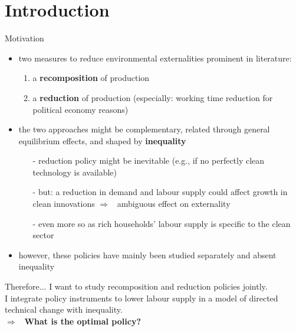 \documentclass[11pt,aspectratio=169]{beamer}
\newcommand{\ar}{$\Rightarrow$ \ }
\begin{document}
\section{Introduction}
\begin{frame}{Motivation}

\begin{itemize}
\item two measures to reduce environmental externalities prominent in literature: 
\begin{enumerate}
\item a \alert{\textbf{recomposition}} of production
\item a \textbf{\alert{reduction}} of production (especially: working time reduction for political economy reasons)
\end{enumerate}
\vspace{3mm} 
\item the two approaches might be complementary, related through general equilibrium effects, and shaped by \textbf{\alert{inequality}}
\vspace{3mm}
\begin{itemize}
\item[-] reduction policy might be inevitable (e.g., if no perfectly clean technology is available)
\item[-] but: a reduction in demand and labour supply could affect growth in clean innovations \ar ambiguous effect on externality
\item[-] even more so as rich households' labour supply is specific to the clean sector
\end{itemize}
\vspace{3mm}
\item however,  these policies have mainly been studied separately and absent inequality
\end{itemize}
\end{frame}

\begin{frame}
	\begin{block}{Therefore...}
I want to study recomposition and reduction policies jointly. 
\\
I integrate policy instruments to lower labour supply in a model of directed technical change with  inequality. \\
\vspace{2mm}
\ar \textbf{What is the optimal policy?}
	\end{block}

\end{frame}
\end{document}
